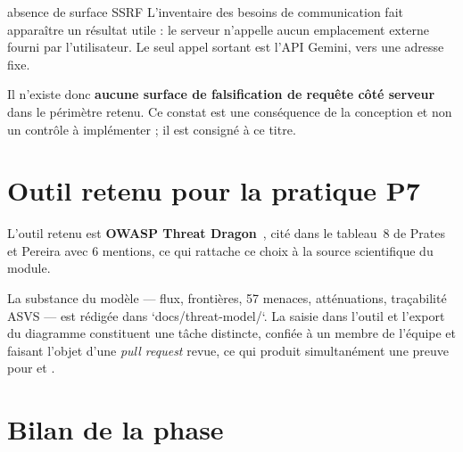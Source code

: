 \begin{constat}{absence de surface SSRF}
L'inventaire des besoins de communication fait apparaître un résultat utile :
le serveur n'appelle aucun emplacement externe fourni par l'utilisateur. Le seul
appel sortant est l'API Gemini, vers une adresse fixe.

Il n'existe donc \textbf{aucune surface de falsification de requête côté
serveur} dans le périmètre retenu. Ce constat est une conséquence de la
conception et non un contrôle à implémenter ; il est consigné à ce titre.
\end{constat}

\section{Outil retenu pour la pratique P7}

L'outil retenu est \textbf{OWASP Threat Dragon}~\cite{threatdragon}, cité dans
le tableau~8 de Prates et Pereira avec 6 mentions, ce qui rattache ce choix à la
source scientifique du module.

La substance du modèle --- flux, frontières, 57 menaces, atténuations,
traçabilité ASVS --- est rédigée dans `docs/threat-model/`. La saisie dans
l'outil et l'export du diagramme constituent une tâche distincte, confiée à un
membre de l'équipe et faisant l'objet d'une \emph{pull request} revue, ce qui
produit simultanément une preuve pour  et .


\section{Bilan de la phase}

